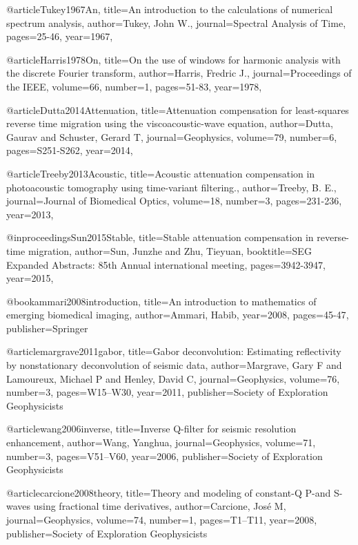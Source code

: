 {@article{Tukey1967An,
  title={An introduction to the calculations of numerical spectrum analysis},
  author={Tukey, John W.},
  journal={Spectral Analysis of Time},
  pages={25-46},
  year={1967},
}

@article{Harris1978On,
  title={On the use of windows for harmonic analysis with the discrete {F}ourier transform},
  author={Harris, Fredric J.},
  journal={Proceedings of the IEEE},
  volume={66},
  number={1},
  pages={51-83},
  year={1978},
}

@article{Dutta2014Attenuation,
  title={Attenuation compensation for least-squares reverse time migration using the viscoacoustic-wave equation},
  author={Dutta, Gaurav and Schuster, Gerard T},
  journal={Geophysics},
  volume={79},
  number={6},
  pages={S251-S262},
  year={2014},
}

@article{Treeby2013Acoustic,
  title={Acoustic attenuation compensation in photoacoustic tomography using time-variant filtering.},
  author={Treeby, B. E.},
  journal={Journal of Biomedical Optics},
  volume={18},
  number={3},
  pages={231-236},
  year={2013},
}

@inproceedings{Sun2015Stable,
  title={Stable attenuation compensation in reverse-time migration},
  author={Sun, Junzhe and Zhu, Tieyuan},
  booktitle={SEG Expanded Abstracts: 85th Annual international meeting},
  pages={3942-3947},
  year={2015},
}

@book{ammari2008introduction,
  title={An introduction to mathematics of emerging biomedical imaging},
  author={Ammari, Habib},
  year={2008},
  pages={45-47},
  publisher={Springer}
}


@article{margrave2011gabor,
  title={Gabor deconvolution: Estimating reflectivity by nonstationary deconvolution of seismic data},
  author={Margrave, Gary F and Lamoureux, Michael P and Henley, David C},
  journal={Geophysics},
  volume={76},
  number={3},
  pages={W15--W30},
  year={2011},
  publisher={Society of Exploration Geophysicists}
}

@article{wang2006inverse,
  title={Inverse {Q}-filter for seismic resolution enhancement},
  author={Wang, Yanghua},
  journal={Geophysics},
  volume={71},
  number={3},
  pages={V51--V60},
  year={2006},
  publisher={Society of Exploration Geophysicists}
}

@article{carcione2008theory,
  title={Theory and modeling of constant-{Q} {P}-and {S}-waves using fractional time derivatives},
  author={Carcione, Jos{\'e} M},
  journal={Geophysics},
  volume={74},
  number={1},
  pages={T1--T11},
  year={2008},
  publisher={Society of Exploration Geophysicists}
}


}
